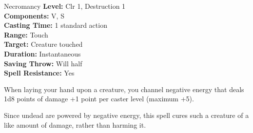 {Necromancy}
{
	\textbf{Level:}
	Clr 1, Destruction 1\\
	\textbf{Components:}
	V, S\\
	\textbf{Casting Time:}
	1 standard action\\
	\textbf{Range:}
	Touch\\
	\textbf{Target:}
	Creature touched\\
	\textbf{Duration:}
	Instantaneous\\
	\textbf{Saving Throw:}
	Will half\\
	\textbf{Spell Resistance:}
	Yes\\
}
{
	When laying your hand upon a creature, you channel negative energy that deals 1d8 points of damage +1 point per caster level (maximum +5).

	Since undead are powered by negative energy, this spell cures such a creature of a like amount of damage, rather than harming it.

}
